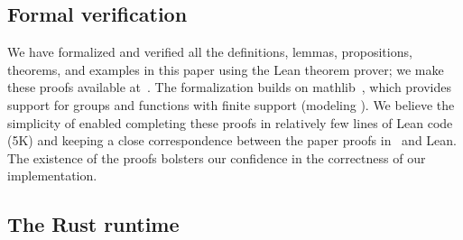 \subsection{Formal verification}

We have formalized and verified all the definitions, lemmas,
propositions, theorems, and examples in this paper using the Lean
theorem prover; we make these proofs available at~\cite{dbsp-theory}.
The formalization builds on mathlib~\cite{mathlib2020}, which provides
support for groups and functions with finite support (modeling
\zrs). We believe the simplicity of \dbsp enabled completing these
proofs in relatively few lines of Lean code (5K) and keeping a close
correspondence between the paper proofs in~\cite{tr} and Lean.  The
existence of the proofs bolsters our confidence in the correctness of
our implementation.

\subsection{The \dbsp Rust runtime}\label{sec:runtime}


